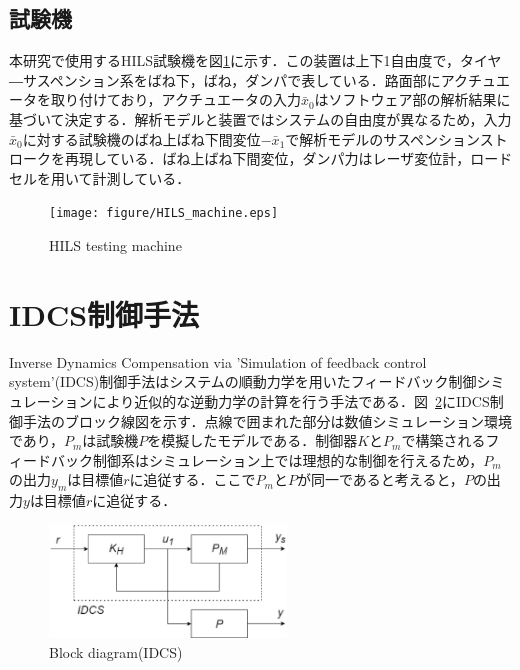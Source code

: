 \documentclass{article_vdlab_sotsuron_youshi}
\begin{document}
\vspace{2mm}
\subsection{試験機}
本研究で使用するHILS試験機を図\ref{fig:testing_machine}に示す．この装置は上下1自由度で，タイヤ―サスペンション系をばね下，ばね，ダンパで表している．路面部にアクチュエータを取り付けており，アクチュエータの入力$\bar{x}_0$はソフトウェア部の解析結果に基づいて決定する．解析モデルと装置ではシステムの自由度が異なるため，入力$\bar{x}_0$に対する試験機のばね上ばね下間変位$-\bar{x}_1$で解析モデルのサスペンションストロークを再現している．ばね上ばね下間変位，ダンパ力はレーザ変位計，ロードセルを用いて計測している．

\vspace{5mm}
\begin{figure}[H]
 \centering
 \texttt{[image: figure/HILS\_machine.eps]}
 \vspace{-8mm}
  \caption{HILS testing machine}
 \label{fig:testing_machine}
\end{figure}

\newpage
\section{IDCS制御手法}
Inverse Dynamics Compensation via 'Simulation of feedback control system'(IDCS)制御手法はシステムの順動力学を用いたフィードバック制御シミュレーションにより近似的な逆動力学の計算を行う手法である\cite{method_idcs}．図~\ref{fig:idcs_block}にIDCS制御手法のブロック線図を示す．点線で囲まれた部分は数値シミュレーション環境であり，$P_m$は試験機$P$を模擬したモデルである．制御器$K$と$P_m$で構築されるフィードバック制御系はシミュレーション上では理想的な制御を行えるため，$P_m$の出力$y_m$は目標値$r$に追従する．ここで$P_m$と$P$が同一であると考えると，$P$の出力$y$は目標値$r$に追従する．

\vspace*{2mm}
\begin{figure}[htp]
  \begin{center}
    \includegraphics[height=30mm]{figure/idcs_block.eps}
    \vspace*{1mm}
    \caption{Block diagram(IDCS)}
    \label{fig:idcs_block}
  \end{center}
\end{figure}
\end{document}
